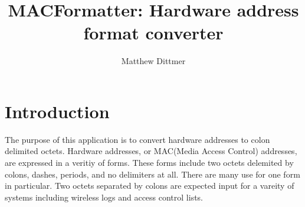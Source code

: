 \documentclass[10pt,a4paper,draft]{report}
\author{Matthew Dittmer}
\title{MACFormatter: Hardware address format converter}
\begin{document}
\maketitle
\chapter*{Introduction}

The purpose of this application is to convert hardware addresses to colon delimited octets.  Hardware addresses, or MAC(Media Access Control) addresses, are expressed in a veritiy of forms.  These forms include two octets delemited by colons, dashes, periods, and no delimiters at all.  There are many use for one form in particular.  Two octets separated by colons are expected input for a vareity of systems including wireless logs and access control lists.
\end{document}
